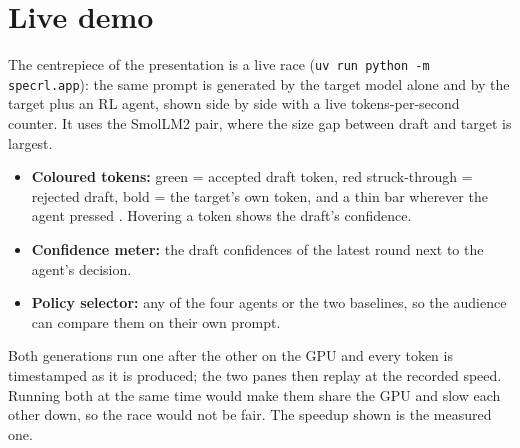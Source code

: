 \section{Live demo}

The centrepiece of the presentation is a live race (\texttt{uv run python -m specrl.app}): the same prompt is
generated by the target model alone and by the target plus an RL agent, shown side by side with a live
tokens-per-second counter. It uses the SmolLM2 pair, where the size gap between draft and target is largest.

\begin{itemize}
  \item \textbf{Coloured tokens:} green = accepted draft token, red struck-through = rejected draft, bold =
  the target's own token, and a thin bar wherever the agent pressed \STOP{}. Hovering a token shows the
  draft's confidence.
  \item \textbf{Confidence meter:} the draft confidences of the latest round next to the agent's decision.
  \item \textbf{Policy selector:} any of the four agents or the two baselines, so the audience can compare
  them on their own prompt.
\end{itemize}

Both generations run one after the other on the GPU and every token is timestamped as it is produced; the
two panes then replay at the recorded speed. Running both at the same time would make them share the GPU and
slow each other down, so the race would not be fair. The speedup shown is the measured one.
